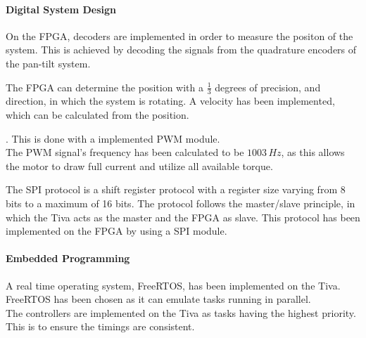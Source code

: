 \documentclass[../../main]{subfiles}
\begin{document}
\paragraph{Digital System Design}
On the FPGA, decoders are implemented in order to measure the positon of the system.
This is achieved by decoding the signals from the quadrature encoders of the pan-tilt system.

The FPGA can determine the position with a  $\frac{1}{3}$ degrees of precision, and direction, in which the system is rotating.
A velocity has been implemented, which can be calculated from the position.\\


. This is done with a implemented PWM module.\\

The PWM signal's frequency has been calculated to be $1003 \si{\,Hz}$, as this allows the motor to draw full current and utilize all available torque. \\

The SPI protocol is a shift register protocol with a register size varying from  8 bits to a maximum of 16 bits.
The protocol follows the master/slave principle, in which the Tiva acts as the master and the FPGA as slave. This protocol has been implemented on the FPGA by using a SPI module.

\paragraph{Embedded Programming}
A real time operating system, FreeRTOS, has been implemented on the Tiva. FreeRTOS has been chosen  as it can  emulate tasks running in parallel. \\
The controllers are implemented on the Tiva as tasks having the highest priority. This is to ensure the timings are consistent.
\end{document}
